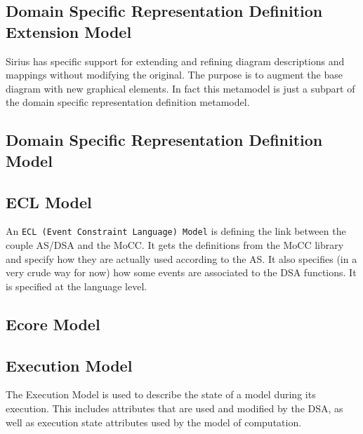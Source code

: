 \documentclass{gemoc} %
\begin{document}

\subsection{Domain Specific Representation Definition Extension Model}
\label{sec:Domain_Specific_Representation_Definition_Extension_Model}
Sirius has specific support for extending and refining diagram descriptions and mappings without modifying the original. The purpose is to augment the base diagram with new graphical elements. In fact this metamodel is just a subpart of the domain specific representation definition metamodel.

\subsection{Domain Specific Representation Definition Model}
\label{sec:Domain_Specific_Representation_Definition_Model}


\subsection{ECL Model}
\label{sec:ECL_Model}
An \texttt{ECL (Event Constraint Language) Model} is defining the link between the couple AS/DSA and the MoCC.
\newline It gets the definitions from the MoCC library and specify how they are actually used according to the AS. It also specifies (in a very crude way for now) how some events are associated to the DSA functions.
\newline It is specified at the language level.

\subsection{Ecore Model}
\label{sec:Ecore_Model}


\subsection{Execution Model}
\label{sec:Execution_Model}
The Execution Model is used to describe the state of a model during its execution. This includes attributes that are used and modified by the DSA, as well as execution state attributes used by the model of computation.
\end{document}
